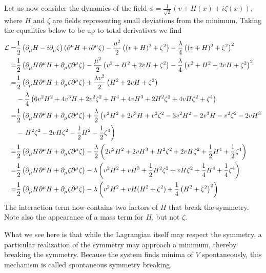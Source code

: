 Let us now consider the dynamics of the field $\phi = \frac{1}{\sqrt{2}}(v + H(x) + i\zeta(x))$, where $H$ and $\zeta$ are fields representing small deviations from the minimum. Taking the equalities below to be up to  total derivatives we find
\begin{align*}
	\mathcal{L} =& \frac{1}{2}\left(\partial^{}_{\mu}H - i\partial^{}_{\mu}\zeta\right)\left(\partial^{\mu}_{}H + i\partial^{\mu}_{}\zeta\right) - \frac{\mu^{2}}{2}\left((v + H)^{2} + \zeta^{2}\right) - \frac{\lambda}{4}\left((v + H)^{2} + \zeta^{2}\right)^{2} \\
	     =& \frac{1}{2}\left(\partial^{}_{\mu}H\partial^{\mu}_{}H + \partial^{}_{\mu}\zeta\partial^{\mu}_{}\zeta\right) - \frac{\mu^{2}}{2}\left(v^{2} + H^{2} + 2vH + \zeta^{2}\right) - \frac{\lambda}{4}\left(v^{2} + H^{2} + 2vH + \zeta^{2}\right)^{2} \\
	     =& \frac{1}{2}\left(\partial^{}_{\mu}H\partial^{\mu}_{}H + \partial^{}_{\mu}\zeta\partial^{\mu}_{}\zeta\right) + \frac{\lambda v^{2}}{2}\left(H^{2} + 2vH + \zeta^{2}\right) \\
	      &- \frac{\lambda}{4}\left(6v^{2}H^{2} + 4v^{3}H + 2v^{2}\zeta^{2} + H^{4} + 4vH^{3} + 2H^{2}\zeta^{2} + 4vH\zeta^{2} + \zeta^{4}\right) \\
	     =& \frac{1}{2}\left(\partial^{}_{\mu}H\partial^{\mu}_{}H + \partial^{}_{\mu}\zeta\partial^{\mu}_{}\zeta\right) + \frac{\lambda}{2}\left(v^{2}H^{2} + 2v^{3}H + v^{2}\zeta^{2} - 3v^{2}H^{2} - 2v^{3}H - v^{2}\zeta^{2} - 2vH^{3} \right. \\
	      &- \left. H^{2}\zeta^{2} - 2vH\zeta^{2} - \frac{1}{2}H^{2} - \frac{1}{2}\zeta^{4}\right) \\
	     =& \frac{1}{2}\left(\partial^{}_{\mu}H\partial^{\mu}_{}H + \partial^{}_{\mu}\zeta\partial^{\mu}_{}\zeta\right) - \frac{\lambda}{2}\left(2v^{2}H^{2} + 2vH^{3} + H^{2}\zeta^{2} + 2vH\zeta^{2} + \frac{1}{2}H^{4} + \frac{1}{2}\zeta^{4}\right) \\
	     =& \frac{1}{2}\left(\partial^{}_{\mu}H\partial^{\mu}_{}H + \partial^{}_{\mu}\zeta\partial^{\mu}_{}\zeta\right) - \lambda\left(v^{2}H^{2} + vH^{3} + \frac{1}{2}H^{2}\zeta^{2} + vH\zeta^{2} + \frac{1}{4}H^{4} + \frac{1}{4}\zeta^{4}\right) \\
	     =& \frac{1}{2}\left(\partial^{}_{\mu}H\partial^{\mu}_{}H + \partial^{}_{\mu}\zeta\partial^{\mu}_{}\zeta\right) - \lambda\left(v^{2}H^{2} + vH(H^{2} + \zeta^{2}) + \frac{1}{4}\left(H^{2} + \zeta^{2}\right)^{2}\right)
\end{align*}
The interaction term now contains two factors of $H$ that break the symmetry. Note also the appearance of a mass term for $H$, but not $\zeta$.

What we see here is that while the Lagrangian itself may respect the symmetry, a particular realization of the symmetry may approach a minimum, thereby breaking the symmetry. Because the system finds minima of $V$ spontaneously, this mechanism is called spontaneous symmetry breaking.

